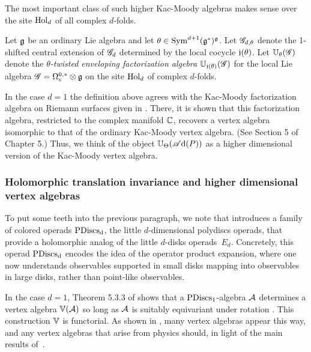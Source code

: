 The most important class of such higher Kac-Moody algebras makes sense over the site ${\rm Hol}_d$ of all complex $d$-folds.

\begin{dfn}
Let $\mathfrak g$ be an ordinary Lie algebra and let $\theta \in {\rm Sym}^{d+1}(\mathfrak g^*)^\mathfrak g$.  
Let $\mathscr G_{d,\theta}$ denote the 1-shifted central extension of $\mathscr G_d$ determined by the local cocycle $\mathfrak j(\theta)$.
Let $\mathbb U_\theta (\mathscr G)$ denote the {\em $\theta$-twisted enveloping factorization algebra} $\mathbb U_{\mathfrak j(\theta)} (\mathscr G)$ for the local Lie algebra $\mathscr G = \Omega^{0,*}_c \otimes \mathfrak g$ on the site ${\rm Hol}_d$ of complex $d$-folds.
\end{dfn}

In the case $d = 1$ the definition above agrees with the Kac-Moody factorization algebra on Riemann surfaces given in \cite{CG1}.
There, it is shown that this factorization algebra, restricted to the complex manifold $\mathbb C$, recovers a vertex algebra isomorphic to that of the ordinary Kac-Moody vertex algebra.
(See Section 5 of Chapter 5.)
Thus, we think of the object $\mathbb U_\Theta(\mathscr A{\rm d}(P))$ as a higher dimensional version of the Kac-Moody vertex algebra.

\subsubsection{Holomorphic translation invariance and higher dimensional vertex algebras} \label{sec: hol trans main}

To put some teeth into the previous paragraph,
we note that \cite{CG1} introduces a family of colored operads ${\rm PDiscs_d}$, the little $d$-dimensional polydiscs operads,
that provide a holomorphic analog of the little $d$-disks operads~$E_d$.
Concretely, this operad ${\rm PDiscs_d}$ encodes the idea of the operator product expansion, 
where one now understands observables supported in small disks mapping into observables in large disks, rather than point-like observables.


In the case $d=1$, Theorem 5.3.3 of \cite{CG1} shows that a ${\rm PDiscs_1}$-algebra $\mathcal A$ determines a vertex algebra $\mathbb V(\mathcal A)$ so long as $\mathcal A$ is suitably equivariant under rotation .
This construction $\mathbb V$ is functorial.
As shown in \cite{CG1}, many vertex algebras appear this way, and any vertex algebras that arise from physics should, in light of the main results of~\cite{CG1,CG2}.


